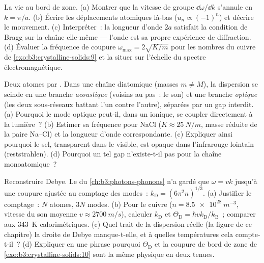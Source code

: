\begin{exercise}[$\star\star\star$]\label{exo:b3:crystalline-solids:10}
La vie au bord de zone. (a) Montrer que la vitesse de groupe
$\dd\omega/\dd k$ s'annule en $k = \pi/a$. (b) Écrire les
déplacements atomiques là-bas ($u_n \propto (-1)^n$) et décrire le
mouvement. (c) Interpréter~: la longueur d'onde $2a$ satisfait la
condition de Bragg sur la chaîne elle-même --- l'onde est sa propre
expérience de diffraction. (d) Évaluer la fréquence de coupure
$\omega_{\text{max}} = 2\sqrt{K/m}$ pour les nombres du cuivre de
\cref{exo:b3:crystalline-solids:9} et la situer sur l'échelle du
spectre électromagnétique.
\end{exercise}

\begin{exercise}[$\star\star\star$]\label{exo:b3:crystalline-solids:11}
Deux atomes par . Dans une chaîne diatomique (masses
$m \ne M$), la dispersion se scinde en une branche \emph{acoustique}
(voisins au pas~: le son) et une branche \emph{optique} (les deux
sous-réseaux battant l'un contre l'autre), séparées par un gap
interdit. (a) Pourquoi le mode optique peut-il, dans un 
ionique, se coupler directement à la lumière~? (b) Estimer sa
fréquence pour NaCl ($K \approx
\qty{25}{N/m}$, masse réduite de la paire Na--Cl) et la longueur
d'onde correspondante. (c) Expliquer ainsi pourquoi le sel,
transparent dans le visible, est opaque dans l'infrarouge lointain
(reststrahlen). (d) Pourquoi un tel gap n'existe-t-il pas pour la
chaîne monoatomique~?
\end{exercise}

\begin{exercise}[$\star\star\star$]\label{exo:b3:crystalline-solids:12}
Reconstruire Debye. Le  du
\cref{ch:b3:photons-phonons} n'a gardé que $\omega = vk$ jusqu'à une
coupure ajustée au comptage des modes~:
$k_{\text{D}} = (6\pi^2n)^{1/3}$. (a) Justifier le comptage~: $N$
atomes, $3N$ modes. (b) Pour le cuivre ($n = \qty{8.5e28}{m^{-3}}$,
vitesse du son moyenne $v \approx \qty{2700}{m/s}$), calculer
$k_{\text{D}}$ et $\Theta_{\text{D}} =
\hbar vk_{\text{D}}/k_{\text{B}}$~; comparer aux \qty{343}{K}
calorimétriques. (c) Quel trait de la dispersion réelle (la figure de
ce chapitre) la droite de Debye manque-t-elle, et à quelles
températures cela compte-t-il~? (d) Expliquer en une phrase pourquoi
$\Theta_{\text{D}}$ et la coupure de bord de zone de
\cref{exo:b3:crystalline-solids:10} sont la même physique en deux
tenues.
\end{exercise}

